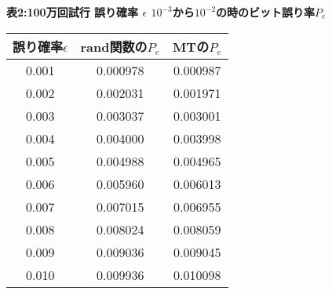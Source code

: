 \documentclass[12pt]{jarticle}
\begin{document}
\begin{center}
  \textbf{表2:100万回試行 誤り確率 $\epsilon$ $10^{-3}$から$10^{-2}$の時のビット誤り率$P_e$}
  \begin{tabular}{|c|c|c|} \hline
    誤り確率$\epsilon$ & rand関数の$P_e$ & MTの$P_e$ \\ \hline
    0.001         & 0.000978        & 0.000987  \\ \hline
    0.002         & 0.002031        & 0.001971  \\ \hline
    0.003         & 0.003037        & 0.003001  \\ \hline
    0.004         & 0.004000        & 0.003998  \\ \hline
    0.005         & 0.004988        & 0.004965  \\ \hline
    0.006         & 0.005960        & 0.006013  \\ \hline
    0.007         & 0.007015        & 0.006955  \\ \hline
    0.008         & 0.008024        & 0.008059  \\ \hline
    0.009         & 0.009036        & 0.009045  \\ \hline
    0.010         & 0.009936        & 0.010098  \\ \hline        
  \end{tabular}
\end{center}
\end{document}
